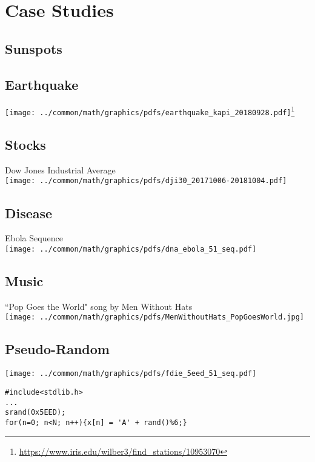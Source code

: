 \chapter{Case Studies}
\section{Sunspots}


\section{Earthquake}
\texttt{[image: ../common/math/graphics/pdfs/earthquake\_kapi\_20180928.pdf]}\footnote{\url{https://www.iris.edu/wilber3/find_stations/10953070}}

\section{Stocks}
Dow Jones Industrial Average
\\\texttt{[image: ../common/math/graphics/pdfs/dji30\_20171006-20181004.pdf]}

\section{Disease}
  Ebola Sequence
\\\texttt{[image: ../common/math/graphics/pdfs/dna\_ebola\_51\_seq.pdf]}

\section{Music}
``Pop Goes the World" song by Men Without Hats
\\\texttt{[image: ../common/math/graphics/pdfs/MenWithoutHats\_PopGoesWorld.jpg]}

\section{Pseudo-Random}
\texttt{[image: ../common/math/graphics/pdfs/fdie\_5eed\_51\_seq.pdf]}

\begin{lstlisting}
#include<stdlib.h>
...
srand(0x5EED);
for(n=0; n<N; n++){x[n] = 'A' + rand()%6;}
\end{lstlisting}

